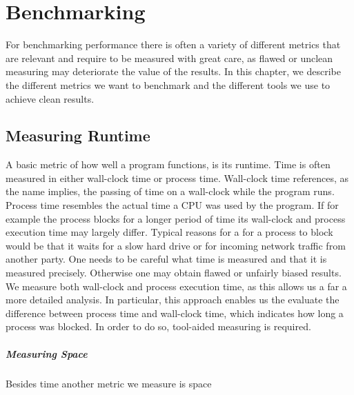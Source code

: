 \chapter{Benchmarking}
For benchmarking performance there is often a variety of different metrics that are relevant and require to be measured with great care, as flawed or unclean measuring may deteriorate the value of the results. In this chapter, we describe the different metrics we want to benchmark and the different tools we use to achieve clean results. 

\section{Measuring Runtime}
A basic metric of how well a program functions, is its runtime. Time is often measured in either wall-clock time or process time. Wall-clock time references, as the name implies, the passing of time on a wall-clock while the program runs. 
Process time resembles the actual time a CPU was used by the program. If for example the process blocks for a longer period of time its wall-clock and process execution time may largely differ. Typical reasons for a for a process to block would be that it waits for a slow hard drive or for incoming network traffic from another party. One needs to be careful what time is measured and that it is measured precisely. Otherwise one may obtain flawed or unfairly biased results. We measure both wall-clock and process execution time, as this allows us a far a more detailed analysis. In particular, this approach enables us the evaluate the difference between process time and wall-clock time, which indicates how long a process was blocked. In order to do so, tool-aided measuring is required.

\paragraph{Measuring Space}
Besides time another metric we measure is space

